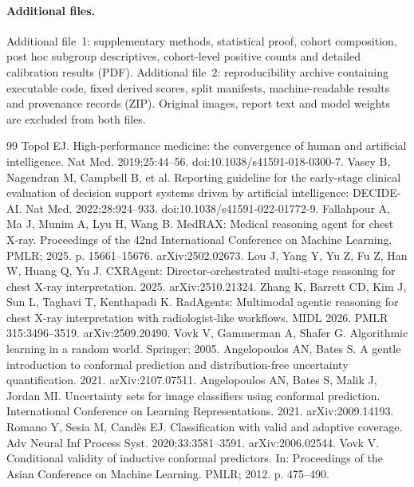 \documentclass[10pt,a4paper]{article}
\begin{document}
\paragraph{Additional files.} Additional file~1: supplementary methods, statistical proof, cohort composition, post hoc subgroup descriptives, cohort-level positive counts and detailed calibration results (PDF). Additional file~2: reproducibility archive containing executable code, fixed derived scores, split manifests, machine-readable results and provenance records (ZIP). Original images, report text and model weights are excluded from both files.
\begin{thebibliography}{99}
\small
{}
Topol EJ. High-performance medicine: the convergence of human and artificial intelligence. Nat Med. 2019;25:44--56. doi:10.1038/s41591-018-0300-7.
Vasey B, Nagendran M, Campbell B, et al. Reporting guideline for the early-stage clinical evaluation of decision support systems driven by artificial intelligence: DECIDE-AI. Nat Med. 2022;28:924--933. doi:10.1038/s41591-022-01772-9.
 Fallahpour A, Ma J, Munim A, Lyu H, Wang B. MedRAX: Medical reasoning agent for chest X-ray. Proceedings of the 42nd International Conference on Machine Learning. PMLR; 2025. p. 15661--15676. arXiv:2502.02673.
 Lou J, Yang Y, Yu Z, Fu Z, Han W, Huang Q, Yu J. CXRAgent: Director-orchestrated multi-stage reasoning for chest X-ray interpretation. 2025. arXiv:2510.21324.
 Zhang K, Barrett CD, Kim J, Sun L, Taghavi T, Kenthapadi K. RadAgents: Multimodal agentic reasoning for chest X-ray interpretation with radiologist-like workflows. MIDL 2026. PMLR 315:3496--3519. arXiv:2509.20490.
 Vovk V, Gammerman A, Shafer G. Algorithmic learning in a random world. Springer; 2005.
 Angelopoulos AN, Bates S. A gentle introduction to conformal prediction and distribution-free uncertainty quantification. 2021. arXiv:2107.07511.
Angelopoulos AN, Bates S, Malik J, Jordan MI. Uncertainty sets for image classifiers using conformal prediction. International Conference on Learning Representations. 2021. arXiv:2009.14193.
Romano Y, Sesia M, Cand\`es EJ. Classification with valid and adaptive coverage. Adv Neural Inf Process Syst. 2020;33:3581--3591. arXiv:2006.02544.
Vovk V. Conditional validity of inductive conformal predictors. In: Proceedings of the Asian Conference on Machine Learning. PMLR; 2012. p. 475--490.

\end{thebibliography}
\end{document}
